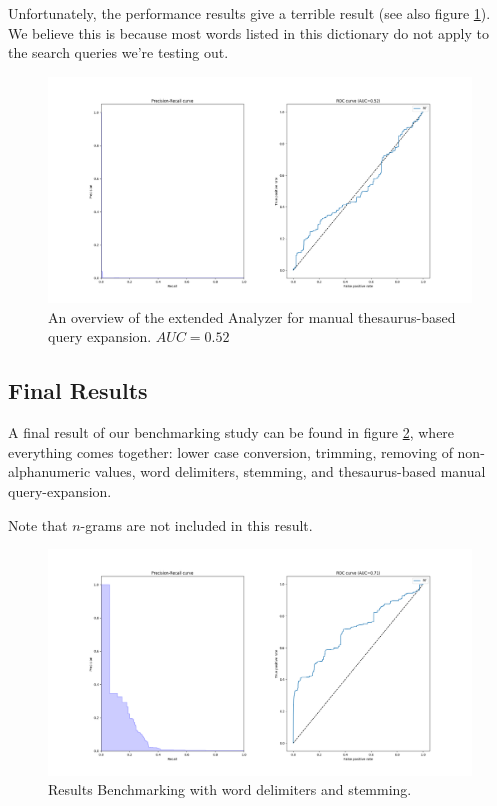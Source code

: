 \documentclass[11pt]{article}
\begin{document}
Unfortunately, the performance results give a terrible result (see also figure \ref{fig:synonyms}). We believe this is because most words listed in this dictionary do not apply to the search queries we're testing out.
\begin{figure}[htp]
	\centering
	\includegraphics[width=\textwidth]{images/customAna-synonyms}
	\caption{An overview of the extended Analyzer for manual thesaurus-based query expansion. $AUC = 0.52$}
	\label{fig:synonyms}
\end{figure}


\subsection{Final Results}
A final result of our benchmarking study can be found in figure \ref{fig:final}, where everything comes together: lower case conversion, trimming, removing of non-alphanumeric values, word delimiters, stemming, and thesaurus-based manual query-expansion.

Note that $n$-grams are not included in this result.

 \begin{figure}[h!]
     \centering
     \includegraphics[width=\textwidth]{images/customAna-stem}
     \caption{Results Benchmarking with word delimiters and stemming.}
     \label{fig:final}
 \end{figure}
\end{document}
